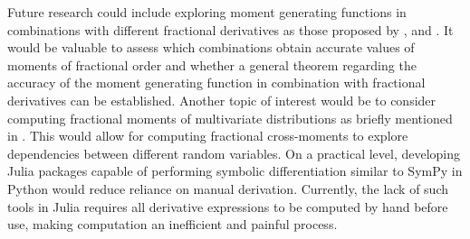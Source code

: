 Future research could include exploring moment generating functions in combinations with different fractional derivatives as those proposed by \citet{hadamard1892}, \citet{riesz1949} and \citet{marchaud1927}. It would be valuable to assess which combinations obtain accurate values of moments of fractional order and whether a general theorem regarding the accuracy of the moment generating function in combination with fractional derivatives can be established. Another topic of interest would be to consider computing fractional moments of multivariate distributions as briefly mentioned in \citet{hansen2024}. This would allow for computing fractional cross-moments to explore dependencies between different random variables. On a practical level, developing Julia packages capable of performing symbolic differentiation similar to SymPy in Python \citep{meurer2017} would reduce reliance on manual derivation. Currently, the lack of such tools in Julia requires all derivative expressions to be computed by hand before use, making computation an inefficient and painful process.